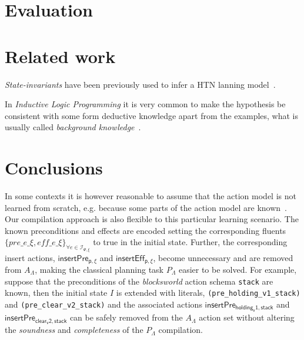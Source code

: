\documentclass{article}
\begin{document}
\section{Evaluation}
\label{sec:evaluation}

\section{Related work}
\label{sec:related}
{\em State-invariants} have been previously used to infer a HTN lanning model~\cite{lotinac2016constructing}.

In {\em Inductive Logic Programming} it is very common to make the hypothesis be consistent with some form deductive knowledge apart from the examples, what is usually called {\em background knowledge}~\cite{muggleton1994inductive}.



\section{Conclusions}
\label{sec:conclusions}
In some contexts it is however reasonable to assume that the action model is not learned from scratch, e.g. because some parts of the action model are known~\cite{ZhuoNK13,sreedharan2018handling,pereira2018heuristic}. Our compilation approach is also flexible to this particular learning scenario. The known preconditions and effects are encoded setting the corresponding fluents $\{pre\_e\_\xi, eff\_e\_\xi\}_{\forall e\in{\mathcal I}_{\Psi,\xi}}$ to true in the initial state. Further, the corresponding insert actions, $\mathsf{insertPre_{p,\xi}}$ and $\mathsf{insertEff_{p,\xi}}$, become unnecessary and are removed from $A_{\Lambda}$, making the classical planning task $P_{\Lambda}$ easier to be solved. For example, suppose that the preconditions of the {\em blocksworld} action schema {\tt stack} are known, then the initial state $I$ is extended with literals, {\small\tt(pre\_holding\_v1\_stack)} and {\small\tt(pre\_clear\_v2\_stack)} and the associated actions $\mathsf{insertPre_{holding_v1,stack}}$ and $\mathsf{insertPre_{clear_v2,stack}}$ can be safely removed from the $A_{\Lambda}$ action set without altering the {\em soundness} and {\em completeness} of the $P_{\Lambda}$ compilation.



\end{document}
